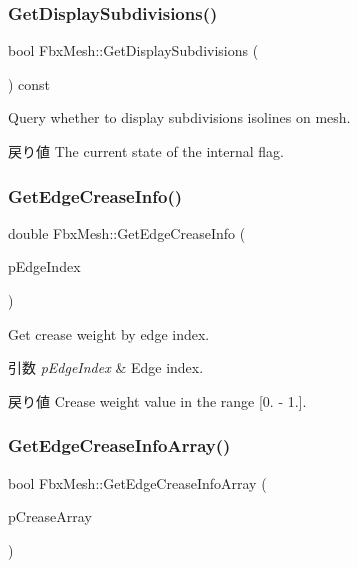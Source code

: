 \subsubsection{\texorpdfstring{Get\+Display\+Subdivisions()}{GetDisplaySubdivisions()}}
{\footnotesize\ttfamily bool Fbx\+Mesh\+::\+Get\+Display\+Subdivisions (\begin{DoxyParamCaption}{ }\end{DoxyParamCaption}) const}

Query whether to display subdivisions isolines on mesh. \begin{DoxyReturn}{戻り値}
The current state of the internal flag. 
\end{DoxyReturn}
\mbox{\label{class_fbx_mesh_aef4f5b60a40bb28395bc784be6ec1f63}} 
\subsubsection{\texorpdfstring{Get\+Edge\+Crease\+Info()}{GetEdgeCreaseInfo()}}
{\footnotesize\ttfamily double Fbx\+Mesh\+::\+Get\+Edge\+Crease\+Info (\begin{DoxyParamCaption}\item[{int}]{p\+Edge\+Index }\end{DoxyParamCaption})}

Get crease weight by edge index. 
\begin{DoxyParams}{引数}
{\em p\+Edge\+Index} & Edge index. \\
\hline
\end{DoxyParams}
\begin{DoxyReturn}{戻り値}
Crease weight value in the range \mbox{[}0. -\/ 1.\mbox{]}. 
\end{DoxyReturn}
\mbox{\label{class_fbx_mesh_a5d234684ab39de2e06af7a79a1f7721d}} 
\subsubsection{\texorpdfstring{Get\+Edge\+Crease\+Info\+Array()}{GetEdgeCreaseInfoArray()}}
{\footnotesize\ttfamily bool Fbx\+Mesh\+::\+Get\+Edge\+Crease\+Info\+Array (\begin{DoxyParamCaption}\item[{\hyperlink{class_fbx_layer_element_array_template}{Fbx\+Layer\+Element\+Array\+Template}$<$ double $>$ $\ast$$\ast$}]{p\+Crease\+Array }\end{DoxyParamCaption})}


